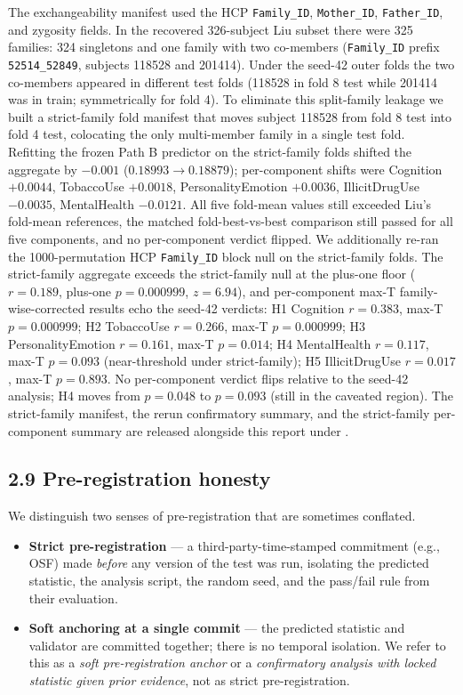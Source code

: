 \documentclass[11pt,letterpaper]{report}
\begin{document}
The exchangeability manifest used the HCP \texttt{Family\_ID}, \texttt{Mother\_ID}, \texttt{Father\_ID}, and zygosity fields. In the recovered 326-subject Liu subset there were 325 families: 324 singletons and one family with two co-members (\texttt{Family\_ID} prefix \texttt{52514\_52849}, subjects 118528 and 201414). Under the seed-42 outer folds the two co-members appeared in different test folds (118528 in fold 8 test while 201414 was in train; symmetrically for fold 4). To eliminate this split-family leakage we built a strict-family fold manifest that moves subject 118528 from fold 8 test into fold 4 test, colocating the only multi-member family in a single test fold. Refitting the frozen Path B predictor on the strict-family folds shifted the aggregate by $-0.001$ ($0.18993 \rightarrow 0.18879$); per-component shifts were Cognition $+0.0044$, TobaccoUse $+0.0018$, PersonalityEmotion $+0.0036$, IllicitDrugUse $-0.0035$, MentalHealth $-0.0121$. All five fold-mean values still exceeded Liu's fold-mean references, the matched fold-best-vs-best comparison still passed for all five components, and no per-component verdict flipped. We additionally re-ran the 1000-permutation HCP \texttt{Family\_ID} block null on the strict-family folds. The strict-family aggregate exceeds the strict-family null at the plus-one floor ($r = 0.189$, plus-one $p = 0.000999$, $z = 6.94$), and per-component max-T family-wise-corrected results echo the seed-42 verdicts: H1 Cognition $r = 0.383$, max-T $p = 0.000999$; H2 TobaccoUse $r = 0.266$, max-T $p = 0.000999$; H3 PersonalityEmotion $r = 0.161$, max-T $p = 0.014$; H4 MentalHealth $r = 0.117$, max-T $p = 0.093$ (near-threshold under strict-family); H5 IllicitDrugUse $r = 0.017$, max-T $p = 0.893$. No per-component verdict flips relative to the seed-42 analysis; H4 moves from $p = 0.048$ to $p = 0.093$ (still in the caveated region). The strict-family manifest, the rerun confirmatory summary, and the strict-family per-component summary are released alongside this report under .

\subsection*{2.9 Pre-registration honesty}

We distinguish two senses of pre-registration that are sometimes conflated.

\begin{itemize}[leftmargin=1.6em,itemsep=0.2em]
\item \textbf{Strict pre-registration} --- a third-party-time-stamped commitment (e.g., OSF) made \emph{before} any version of the test was run, isolating the predicted statistic, the analysis script, the random seed, and the pass/fail rule from their evaluation.
\item \textbf{Soft anchoring at a single commit} --- the predicted statistic and validator are committed together; there is no temporal isolation. We refer to this as a \emph{soft pre-registration anchor} or a \emph{confirmatory analysis with locked statistic given prior evidence}, not as strict pre-registration.
\end{itemize}
\end{document}
